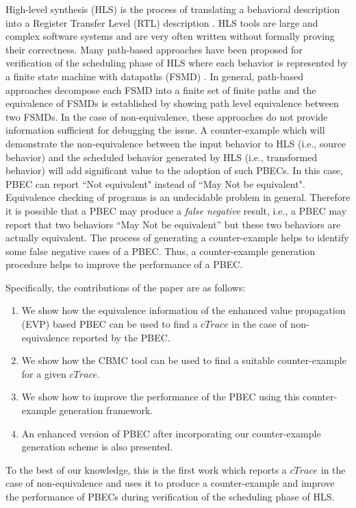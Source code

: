 High-level synthesis (HLS) is the process of translating a behavioral
description into a Register Transfer Level (RTL) description \cite{Gajski92}.
HLS tools are large and complex software systems and are very often written
without formally proving their correctness. Many path-based
approaches
\cite{KimKM04,KimM08,HuLL16,Banerjee14,Karfa12,Karfa08,Chouksey18} have
been proposed for verification of the scheduling phase of HLS
where each behavior is represented by a finite state machine with datapaths (FSMD) \cite{Gajski92}. In
general, path-based approaches decompose each FSMD into a 
finite set of finite paths and the equivalence of FSMDs
is established by showing path level equivalence between two  FSMDs.
In the case of non-equivalence, these approaches do not provide information 
sufficient for debugging the issue. 
A counter-example which will demonstrate the non-equivalence
between the input behavior to HLS (i.e., source behavior) and 
the scheduled behavior generated by HLS (i.e., transformed behavior) will add significant value to
the adoption of such PBECs. In this case, PBEC can report ``Not
equivalent" instead of ``May Not be equivalent".  Equivalence checking of programs is
an undecidable  problem in general. Therefore it is possible that a PBEC may produce a
\textit{false negative} result, i.e., a PBEC may report that 
two behaviors ``May Not be equivalent'' but these two behaviors are actually equivalent.
The process of generating a counter-example helps to identify some
false negative cases of a PBEC.  
Thus, a counter-example generation procedure helps to improve the performance of a PBEC. 

Specifically, the contributions of the paper are as follows: 
\begin{enumerate} 
\item We show how the equivalence information of the enhanced value propagation
(EVP) based PBEC \cite{Chouksey18} can be used to find a $cTrace$ in the case
of non-equivalence reported by the PBEC.
\item We show how the CBMC \cite{Clarke04CBMC} tool can be used to find a suitable
counter-example for a given $cTrace$. 
\item We show how to improve the performance of the PBEC using this
counter-example generation framework.
\item An enhanced version of PBEC \cite{Chouksey18} after incorporating our
counter-example generation scheme is also presented.  
\end{enumerate} 
To the best of our knowledge, this is the first work which
reports a $cTrace$ in the case of non-equivalence and uses it to produce a
counter-example and improve the performance of PBECs during verification of 
the scheduling phase of HLS.

